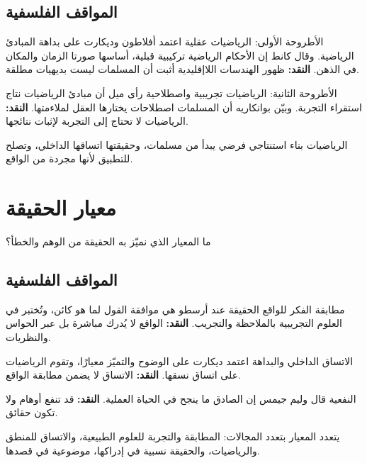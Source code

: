 \documentclass[12pt, twoside, openright]{book}
\begin{document}
\subsection*{المواقف الفلسفية}
\begin{positionbox}{الأطروحة الأولى: الرياضيات عقلية}
اعتمد أفلاطون وديكارت على بداهة المبادئ الرياضية. وقال كانط إن الأحكام الرياضية تركيبية قبلية، أساسها صورتا الزمان والمكان في الذهن. \textbf{النقد:} ظهور الهندسات اللاإقليدية أثبت أن المسلمات ليست بديهيات مطلقة.
\end{positionbox}
\begin{positionbox}{الأطروحة الثانية: الرياضيات تجريبية واصطلاحية}
رأى ميل أن مبادئ الرياضيات نتاج استقراء التجربة. وبيّن بوانكاريه أن المسلمات اصطلاحات يختارها العقل لملاءمتها. \textbf{النقد:} الرياضيات لا تحتاج إلى التجربة لإثبات نتائجها.
\end{positionbox}
\begin{synthbox}
الرياضيات بناء استنتاجي فرضي يبدأ من مسلمات، وحقيقتها اتساقها الداخلي، وتصلح للتطبيق لأنها مجردة من الواقع.
\end{synthbox}

\section{معيار الحقيقة}
\begin{problembox}
ما المعيار الذي نميّز به الحقيقة من الوهم والخطأ؟
\end{problembox}
\subsection*{المواقف الفلسفية}
\begin{positionbox}{مطابقة الفكر للواقع}
الحقيقة عند أرسطو هي موافقة القول لما هو كائن، وتُختبر في العلوم التجريبية بالملاحظة والتجريب. \textbf{النقد:} الواقع لا يُدرك مباشرة بل عبر الحواس والنظريات.
\end{positionbox}
\begin{positionbox}{الاتساق الداخلي والبداهة}
اعتمد ديكارت على الوضوح والتميّز معيارًا، وتقوم الرياضيات على اتساق نسقها. \textbf{النقد:} الاتساق لا يضمن مطابقة الواقع.
\end{positionbox}
\begin{positionbox}{النفعية}
قال وليم جيمس إن الصادق ما ينجح في الحياة العملية. \textbf{النقد:} قد تنفع أوهام ولا تكون حقائق.
\end{positionbox}
\begin{synthbox}
يتعدد المعيار بتعدد المجالات: المطابقة والتجربة للعلوم الطبيعية، والاتساق للمنطق والرياضيات، والحقيقة نسبية في إدراكها، موضوعية في قصدها.
\end{synthbox}
\end{document}
